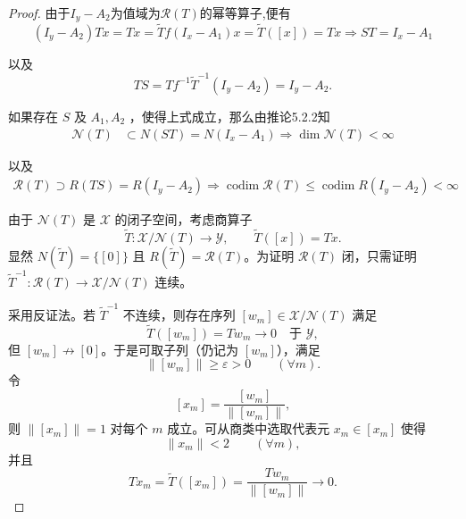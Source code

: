 \documentclass[lang=cn,newtx,10pt,scheme=chinese,thmcnt=chapter]{elegantbook}
\begin{document}
\begin{problemset}
\begin{proof}
由于$I_y-A_2$为值域为$\mathcal{R}(T)$的幂等算子,便有
$$
\left(I_y-A_2\right) T x=Tx= \widetilde{T}f(I_x-A_1) x=\widetilde{T}([x])=Tx\Rightarrow ST=I_x-A_1
$$


以及
$$
T S=Tf^{-1} \widetilde{T}^{-1}\left(I_y-A_2\right)=I_y-A_2 .
$$
\begin{center}
\end{center}
如果存在 $S$ 及 $A_1, A_2$ ，使得上式成立，那么由推论5.2.2知
$$
\begin{aligned}
\mathcal{N}(T) & \subset N\left(S T\right)=N\left(I_x-A_1\right) 
\Longrightarrow  \operatorname{dim} \mathcal{N}(T)<\infty
\end{aligned}
$$

以及
$$
\begin{aligned}
\mathcal{R}(T) \supset R\left(T S\right)=R\left(I_y-A_2\right)  \Longrightarrow \operatorname{codim} \mathcal{R}(T) \leqslant \operatorname{codim} R\left(I_y-A_2\right)<\infty
\end{aligned}
$$

由于 $\mathcal{N}(T)$ 是 $\mathcal X$ 的闭子空间，考虑商算子
\[
\widetilde T:\mathcal X/\mathcal{N}(T)\to \mathcal Y,\qquad 
\widetilde T([x]) = Tx .
\]
显然 $N(\widetilde T)=\{[0]\}$ 且 $R(\widetilde T)=\mathcal{R}(T)$。为证明 $\mathcal{R}(T)$ 闭，只需证明
$\widetilde T^{-1}:\mathcal{R}(T)\to\mathcal X/\mathcal{N}(T)$ 连续。

采用反证法。若 $\widetilde T^{-1}$ 不连续，则存在序列 $[w_m]\in \mathcal X/\mathcal{N}(T)$ 满足
\[
\widetilde T ([w_m]) = T w_m \to 0\quad \text{于 }\mathcal Y,
\]
但 $[w_m]\not\to [0]$。于是可取子列（仍记为 $[w_m]$），满足
\[
\|[w_m]\| \ge \varepsilon > 0\qquad (\forall m).
\]
令
\[
[x_m] = \frac{[w_m]}{\|[w_m]\|},
\]
则 $\|[x_m]\| = 1$ 对每个 $m$ 成立。可从商类中选取代表元 $x_m\in[x_m]$ 使得
\[
\|x_m\| < 2\qquad (\forall m),
\]
并且
\[
T x_m = \widetilde T([x_m]) = \frac{T w_m}{\|[w_m]\|} \longrightarrow 0.
\]


\end{proof}
\end{problemset}
\end{document}
